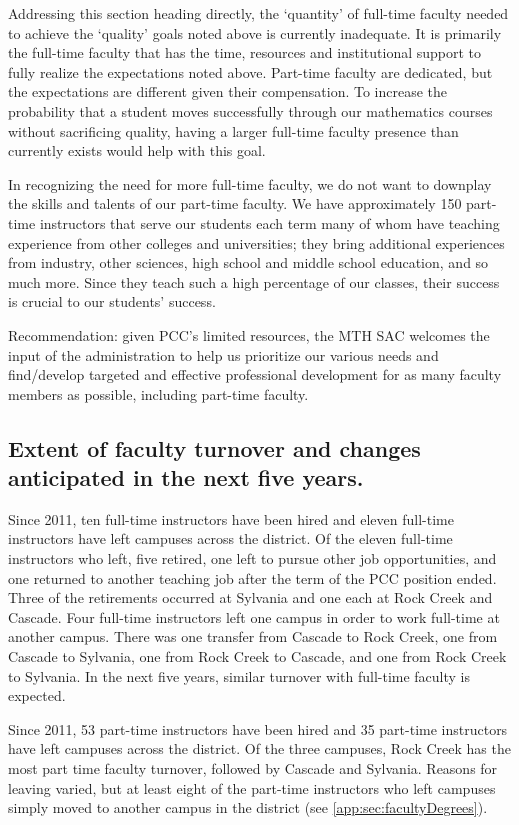 Addressing this section heading directly, the `quantity' of full-time faculty needed to achieve the `quality' goals noted above is currently inadequate.  It is primarily the full-time faculty that has the time, resources and institutional support to fully realize the expectations noted above.  Part-time faculty are dedicated, but the expectations are different given their compensation.   To increase the probability that a student moves successfully through our mathematics courses without sacrificing quality, having a larger full-time faculty presence than currently exists would help with this goal.

In recognizing the need for more full-time faculty, we do not want to downplay the skills and talents of our part-time faculty.  We have approximately 150 part-time instructors that serve our students each term many of whom have teaching experience from other colleges and universities; they bring additional experiences from industry, other sciences, high school and middle school education, and so much more.  Since they teach such a high percentage of our classes, their success is crucial to our students' success.

Recommendation:  given PCC's limited resources, the MTH SAC welcomes the input of the administration to help us prioritize our various needs and find/develop targeted and effective professional development for as many faculty members as possible, including part-time faculty.  

\subsection{Extent of faculty turnover and changes anticipated in the next five years.} 
Since 2011, ten full-time instructors have been hired and eleven full-time instructors have left campuses across the district.  Of the eleven full-time instructors who left, five retired, one left to pursue other job opportunities, and one returned to another teaching job after the term of the PCC position ended.  Three of the retirements occurred at Sylvania and one each at Rock Creek and Cascade.  Four full-time instructors left one campus in order to work full-time at another campus.   There was one transfer from Cascade to Rock Creek, one from Cascade to Sylvania, one from Rock Creek to Cascade, and one from Rock Creek to Sylvania.  In the next five years, similar turnover with full-time faculty is expected.

Since 2011, 53 part-time instructors have been hired and 35 part-time instructors have left campuses across the district.  Of the three campuses, Rock Creek has the most part time faculty turnover, followed by Cascade and Sylvania.  Reasons for leaving varied, but at least eight of the part-time instructors who left campuses simply moved to another campus in the district (see \vref{app:sec:facultyDegrees}).

